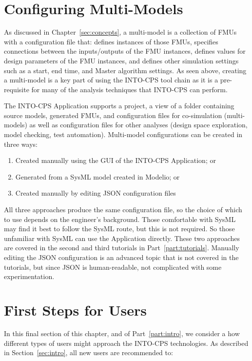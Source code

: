 \newpage
\section{Configuring Multi-Models}

As discussed in Chapter~\ref{sec:concepts}, a multi-model  is a collection of FMUs with a configuration file that: defines instances of those FMUs, specifies connections between the inputs/outputs of the FMU instances, defines values for design parameters of the FMU instances, and defines other simulation settings such as a start, end time, and Master algorithm settings. As seen above, creating a multi-model is a key part of using the INTO-CPS tool chain as it is a pre-requisite for many of the analysis techniques that INTO-CPS can perform.

The INTO-CPS Application supports a project, a view of a folder containing source models, generated FMUs, and configuration files for co-simulation (multi-models) as well as configuration files for other analyses (design space exploration, model checking, test automation). Multi-model configurations can be created in three ways:

\begin{enumerate}[noitemsep]
  \item Created manually using the GUI of the INTO-CPS Application; or
  \item Generated from a SysML model created in Modelio; or
  \item Created manually by editing JSON configuration files
\end{enumerate}

All three approaches produce the same configuration file, so the choice of which to use depends on the engineer's background. Those comfortable with SysML may find it best to follow the SysML route, but this is not required. So those unfamiliar with SysML can use the Application directly.
These two approaches are covered in the second and third tutorials in Part~\ref{part:tutorials}. Manually editing the JSON configuration is an advanced topic that is not covered in the tutorials, but since JSON is human-readable, not complicated with some experimentation.

\section{First Steps for Users}

In this final section of this chapter, and of Part~\ref{part:intro}, we consider a how different types of users might approach the INTO-CPS technologies. As described in Section~\ref{sec:intro}, all new users are recommended to:

